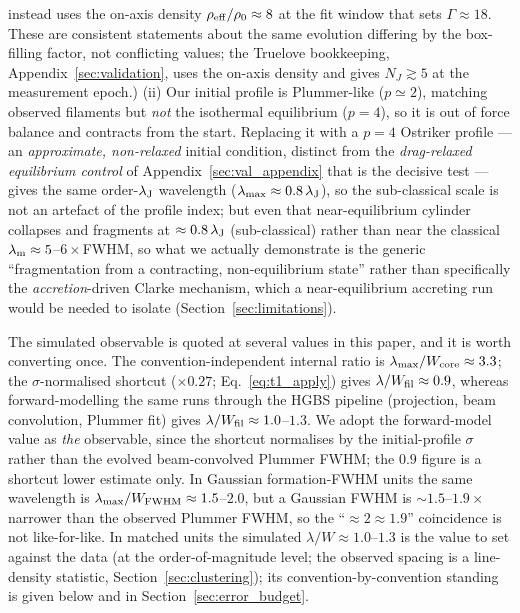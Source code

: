 \documentclass[usenatbib,twoside,twocolumn]{mnras}
\begin{document}
instead uses the on-axis density $\rho_{\rm eff}/\rho_0\approx8$ at the fit window that sets $\Gamma\approx18$. These are consistent statements about the same evolution differing by the box-filling factor, not conflicting values; the Truelove bookkeeping, Appendix~\ref{sec:validation}, uses the on-axis density and gives $N_J\gtrsim5$ at the measurement epoch.) (ii) Our initial profile is Plummer-like ($p\simeq2$), matching observed filaments but \emph{not} the isothermal equilibrium ($p=4$), so it is out of force balance and contracts from the start. Replacing it with a $p=4$ Ostriker profile --- an \emph{approximate, non-relaxed} initial condition, distinct from the \emph{drag-relaxed equilibrium control} of Appendix~\ref{sec:val_appendix} that is the decisive test --- gives the same order-$\lambda_{\rm J}$ wavelength ($\lambda_{\rm max}\approx0.8\,\lambda_{\rm J}$), so the sub-classical scale is not an artefact of the profile index; but even that near-equilibrium cylinder collapses and fragments at $\approx0.8\,\lambda_{\rm J}$ (sub-classical) rather than near the classical $\lambda_{\rm m}\approx5$--$6\times$FWHM, so what we actually demonstrate is the generic ``fragmentation from a contracting, non-equilibrium state'' rather than specifically the \emph{accretion}-driven Clarke mechanism, which a near-equilibrium accreting run would be needed to isolate (Section~\ref{sec:limitations}).

The simulated observable is quoted at several values in this paper, and it is worth converting once. The convention-independent internal ratio is $\lambda_{\rm max}/W_{\rm core}\approx3.3$; the $\sigma$-normalised shortcut ($\times0.27$; Eq.~\ref{eq:t1_apply}) gives $\lambda/W_{\rm fil}\approx0.9$, whereas forward-modelling the same runs through the HGBS pipeline (projection, beam convolution, Plummer fit) gives $\lambda/W_{\rm fil}\approx1.0$--$1.3$. We adopt the forward-model value as \emph{the} observable, since the shortcut normalises by the initial-profile $\sigma$ rather than the evolved beam-convolved Plummer FWHM; the $0.9$ figure is a shortcut lower estimate only. In Gaussian formation-FWHM units the same wavelength is $\lambda_{\rm max}/W_{\rm FWHM}\approx1.5$--$2.0$, but a Gaussian FWHM is $\sim1.5$--$1.9\times$ narrower than the observed Plummer FWHM, so the ``$\approx2\approx1.9$'' coincidence is not like-for-like. In matched units the simulated $\lambda/W\approx1.0$--$1.3$ is the value to set against the data (at the order-of-magnitude level; the observed spacing is a line-density statistic, Section~\ref{sec:clustering}); its convention-by-convention standing is given below and in Section~\ref{sec:error_budget}.
\end{document}
